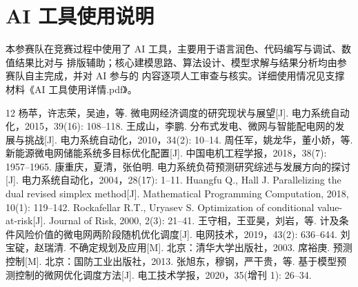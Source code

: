 \documentclass[withoutpreface]{cumcmthesis}
\begin{document}
\section*{AI 工具使用说明}
本参赛队在竞赛过程中使用了 AI 工具，主要用于语言润色、代码编写与调试、数值结果比对与
排版辅助；核心建模思路、算法设计、模型求解与结果分析均由参赛队自主完成，并对 AI 参与的
内容逐项人工审查与核实。详细使用情况见支撑材料《AI 工具使用详情.pdf》。

\begin{thebibliography}{12}
    杨苹，许志荣，吴迪，等.
    \newblock 微电网经济调度的研究现状与展望[J].
    \newblock 电力系统自动化，2015，39(16): 108--118.
    王成山，李鹏.
    \newblock 分布式发电、微网与智能配电网的发展与挑战[J].
    \newblock 电力系统自动化，2010，34(2): 10--14.
    周任军，姚龙华，董小娇，等.
    \newblock 新能源微电网储能系统多目标优化配置[J].
    \newblock 中国电机工程学报，2018，38(7): 1957--1965.
    康重庆，夏清，张伯明.
    \newblock 电力系统负荷预测研究综述与发展方向的探讨[J].
    \newblock 电力系统自动化，2004，28(17): 1--11.
    Huangfu Q., Hall J.
    \newblock Parallelizing the dual revised simplex method[J].
    \newblock Mathematical Programming Computation, 2018, 10(1): 119--142.
    Rockafellar R.T., Uryasev S.
    \newblock Optimization of conditional value-at-risk[J].
    \newblock Journal of Risk, 2000, 2(3): 21--41.
    王守相，王亚昊，刘岩，等.
    \newblock 计及条件风险价值的微电网两阶段随机优化调度[J].
    \newblock 电网技术，2019，43(2): 636--644.
    刘宝碇，赵瑞清.
    \newblock 不确定规划及应用[M].
    \newblock 北京：清华大学出版社，2003.
    席裕庚.
    \newblock 预测控制[M].
    \newblock 北京：国防工业出版社，2013.
    张旭东，穆钢，严干贵，等.
    \newblock 基于模型预测控制的微网优化调度方法[J].
    \newblock 电工技术学报，2020，35(增刊 1): 26--34.
\end{thebibliography}
\end{document}
